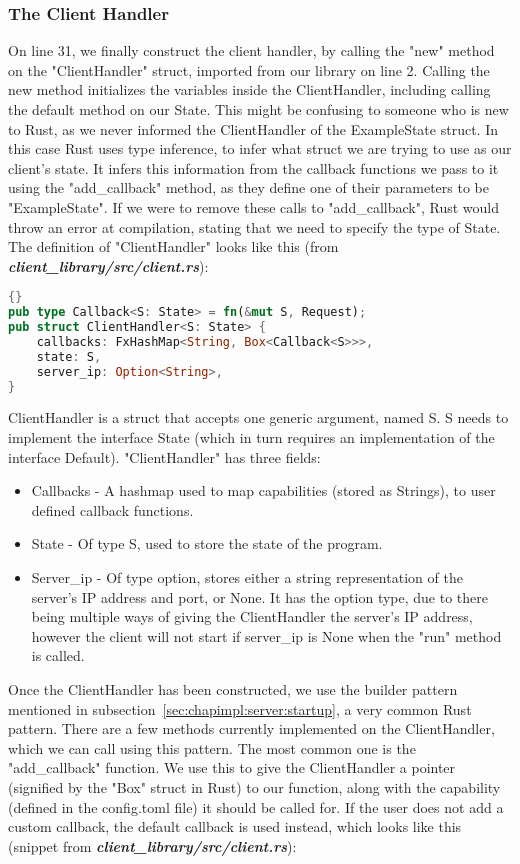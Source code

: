 \subsubsection{The Client Handler}
On line 31, we finally construct the client handler, by calling the "new" method on the "ClientHandler" struct, imported from our library on line 2. Calling the new method initializes the variables inside the ClientHandler, including calling the default method on our State. This might be confusing to someone who is new to Rust, as we never informed the ClientHandler of the ExampleState struct. In this case Rust uses type inference, to infer what struct we are trying to use as our client's state. It infers this information from the callback functions we pass to it using the "add\_callback" method, as they define one of their parameters to be "ExampleState". If we were to remove these calls to "add\_callback", Rust would throw an error at compilation, stating that we need to specify the type of State. The definition of "ClientHandler" looks like this (from \textit{\textbf{client\_library/src/client.rs}}):
\begin{lstlisting}[language=Rust, style=boxed, showstringspaces=false]{}
pub type Callback<S: State> = fn(&mut S, Request);
pub struct ClientHandler<S: State> {
    callbacks: FxHashMap<String, Box<Callback<S>>>,
    state: S,
    server_ip: Option<String>,
}
\end{lstlisting}
ClientHandler is a struct that accepts one generic argument, named S. S needs to implement the interface State (which in turn requires an implementation of the interface Default). "ClientHandler" has three fields:
\begin{itemize}
    \item Callbacks - A hashmap used to map capabilities (stored as Strings), to user defined callback functions.
    \item State - Of type S, used to store the state of the program.
    \item Server\_ip - Of type option, stores either a string representation of the server's IP address and port, or None. It has the option type, due to there being multiple ways of giving the ClientHandler the server's IP address, however the client will not start if server\_ip is None when the "run" method is called.
\end{itemize}

Once the ClientHandler has been constructed, we use the builder pattern mentioned in subsection~\ref{sec:chapimpl:server:startup}, a very common Rust pattern. There are a few methods currently implemented on the ClientHandler, which we can call using this pattern. The most common one is the "add\_callback" function. We use this to give the ClientHandler a pointer (signified by the "Box" struct in Rust) to our function, along with the capability (defined in the config.toml file) it should be called for. If the user does not add a custom callback, the default callback is used instead, which looks like this (snippet from \textit{\textbf{client\_library/src/client.rs}}):

